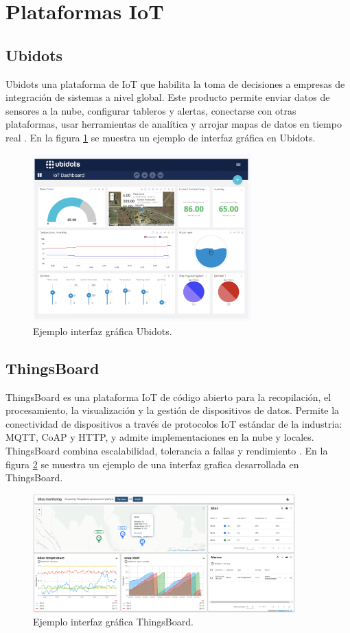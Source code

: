 \section{Plataformas IoT}
\subsection{Ubidots}
Ubidots una plataforma de IoT que habilita la toma de decisiones a empresas de integración de sistemas a nivel global. Este producto permite enviar datos de sensores a la nube, configurar tableros y alertas, conectarse con otras plataformas, usar herramientas de analítica y arrojar mapas de datos en tiempo real \citep{InterfazIoTUbidots}. En la figura \ref{fig:InterfazUBIDOTS} se muestra un ejemplo de interfaz gráfica en Ubidots.

\begin{figure}[htbp]
	\centering
	\includegraphics[width=0.75\textwidth]{./Figures/ubidots.png}
	\caption{Ejemplo interfaz gráfica Ubidots.}
	\label{fig:InterfazUBIDOTS}
\end{figure}
\subsection{ThingsBoard}
ThingsBoard es una plataforma IoT de código abierto para la recopilación, el procesamiento, la visualización y la gestión de dispositivos de datos.
Permite la conectividad de dispositivos a través de protocolos IoT estándar de la industria: MQTT, CoAP y HTTP, y admite implementaciones en la nube y locales. ThingsBoard combina escalabilidad, tolerancia a fallas y rendimiento \citep{THINGSBOARD}. En la figura \ref{fig:InterfazThingsBoard} se muestra un ejemplo de una interfaz grafica desarrollada en ThingsBoard. 
\begin{figure}[htbp]
	\centering
	\includegraphics[width=0.9\textwidth]{./Figures/thingsboard.png}
	\caption{Ejemplo interfaz gráfica ThingsBoard.}
	\label{fig:InterfazThingsBoard}
\end{figure}
